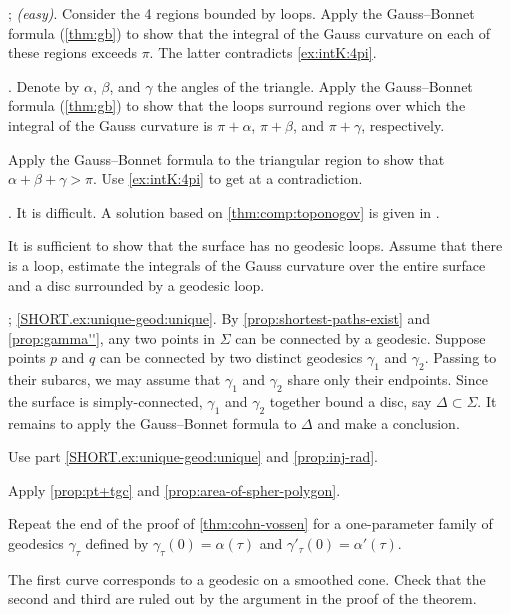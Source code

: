 \parbf{\ref{ex:self-intersections}}; \textit{(easy)}.
Consider the 4 regions bounded by loops.
Apply the Gauss--Bonnet formula (\ref{thm:gb}) to show that the integral of the Gauss curvature on each of these regions exceeds $\pi$.
The latter contradicts \ref{ex:intK:4pi}.

.
Denote by $\alpha$, $\beta$, and $\gamma$ the angles of the triangle.
Apply the Gauss--Bonnet formula (\ref{thm:gb}) to show that the loops surround regions over which the integral of the Gauss curvature is $\pi+\alpha$, $\pi+\beta$, and $\pi+\gamma$, respectively.

Apply the Gauss--Bonnet formula to the triangular region to show that $\alpha+\beta+\gamma>\pi$.
Use \ref{ex:intK:4pi} to get at a contradiction.


.
It is difficult.
A solution based on \ref{thm:comp:toponogov} is given in \cite{petrunin2021}.

It is sufficient to show that the surface has no geodesic loops.
Assume that there is a loop, estimate the integrals of the Gauss curvature over the entire surface and a disc surrounded by a geodesic loop.

\parbf{\ref{ex:unique-geod}}; \ref{SHORT.ex:unique-geod:unique}.
By \ref{prop:shortest-paths-exist} and \ref{prop:gamma''}, any two points in $\Sigma$ can be connected by a geodesic.
Suppose points $p$ and $q$ can be connected by two distinct geodesics $\gamma_1$ and $\gamma_2$.
Passing to their subarcs, we may assume that $\gamma_1$ and $\gamma_2$ share only their endpoints.
Since the surface is simply-connected, $\gamma_1$ and $\gamma_2$ together bound a disc, say $\Delta\subset\Sigma$.
It remains to apply the Gauss--Bonnet formula to $\Delta$ and make a conclusion.
 
Use part \ref{SHORT.ex:unique-geod:unique} and \ref{prop:inj-rad}.

Apply \ref{prop:pt+tgc} and \ref{prop:area-of-spher-polygon}.

Repeat the end of the proof of \ref{thm:cohn-vossen} for a one-parameter family of geodesics $\gamma_\tau$ defined by $\gamma_\tau(0)=\alpha(\tau)$ and $\gamma'_\tau(0)=\alpha'(\tau)$.

The first curve corresponds to a geodesic on a smoothed cone.
Check that the second and third are ruled out by the argument in the proof of the theorem.

